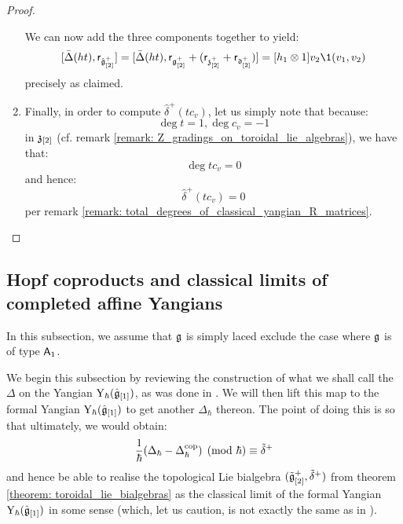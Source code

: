 \begin{proof}
\begin{enumerate}
                    We can now add the three components together to yield:
                        $$[\bar{\Delta}(ht), \sfr_{\hat{\g}_{[2]}^+}] = [ \bar{\Delta}(ht), \sfr_{\g_{[2]}^+} + (\sfr_{\z_{[2]}^+} + \sfr_{\d_{[2]}^+}) ] =  [h_1 \tensor 1] v_2 \1(v_1, v_2)$$
                    precisely as claimed. 
                    
                    \item Finally, in order to compute $\hat{\delta}^+(t c_v)$, let us simply note that because:
                        $$\deg t = 1, \deg c_v = -1$$
                    in $\mathfrak{z}_{[2]}$ (cf. remark \ref{remark: Z_gradings_on_toroidal_lie_algebras}), we have that:
                        $$\deg t c_v = 0$$
                    and hence:
                        $$\hat{\delta}^+(t c_v) = 0$$
                    per remark \ref{remark: total_degrees_of_classical_yangian_R_matrices}.
                \end{enumerate}
            \end{proof}
    
    \subsection{Hopf coproducts and classical limits of completed affine Yangians}
        \begin{convention}
            In this subsection, we assume that $\mathfrak{g}$ is simply laced exclude the case where $\mathfrak{g}$ is of type $\mathsf{A}_1$. 
        \end{convention}

        We begin this subsection by reviewing the construction of what we shall call the  $\Delta$ on the Yangian $\mathrm{Y}_{\hbar}(\hat{\mathfrak{g}}_{[1]})$, as was done in \cite[Sections 4 and 5]{guay_nakajima_wendlandt_affine_yangian_coproduct}. We will then lift this map to the formal Yangian $\mathrm{Y}_{\hbar}(\hat{\mathfrak{g}}_{[1]})$ to get another  $\Delta_{\hbar}$ thereon. The point of doing this is so that ultimately, we would obtain:
            $$\frac{1}{\hbar}(\Delta_{\hbar} - \Delta_{\hbar}^{\mathrm{cop}}) \pmod{\hbar} \equiv \tilde{\delta}^+$$
        and hence be able to realise the topological Lie bialgebra $(\tilde{\mathfrak{g}}_{[2]}^+, \tilde{\delta}^+)$ from theorem \ref{theorem: toroidal_lie_bialgebras} as the classical limit of the formal Yangian $\mathrm{Y}_{\hbar}(\hat{\mathfrak{g}}_{[1]})$ in some sense (which, let us caution, is not exactly the same as in \cite{etingof_kazhdan_quantisation_1}).
        
